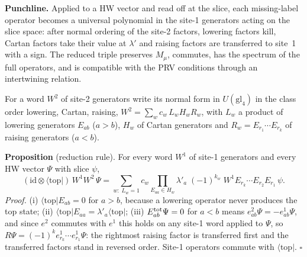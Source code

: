 \documentclass[11pt]{article}
\makeatletter
\renewcommand\subsection{\@startsection{subsection}{2}{\z@}{-2.0ex \@plus -1ex \@minus -.2ex}{0.6ex \@plus .2ex}{\normalfont\normalsize\bfseries}}
\makeatother
\begin{document}
\textbf{Punchline.} Applied to a HW vector and read off at the slice, each missing-label operator becomes a universal polynomial in the site-1 generators acting on the slice space: after normal ordering of the site-2 factors, lowering factors kill, Cartan factors take their value at $\lambda'$ and raising factors are transferred to site~1 with a sign.
The reduced triple preserves $M_\mu$, commutes, has the spectrum of the full operators, and is compatible with the PRV conditions through an intertwining relation.

\subsection{The rule}\label{sec:rule}

For a word $W^2$ of site-2 generators write its normal form in $U(\mathrm{gl}_4)$ in the class order lowering, Cartan, raising, $W^2=\sum_wc_w\,L_wH_wR_w$, with $L_w$ a product of lowering generators $E_{ab}$ ($a>b$), $H_w$ of Cartan generators and $R_w=E_{r_1}\cdots E_{r_k}$ of raising generators ($a<b$).

\textbf{Proposition} (reduction rule).
For every word $W^1$ of site-1 generators and every HW vector $\Psi$ with slice $\psi$,
\begin{equation}\label{eq:rule}
(\mathrm{id}\otimes\langle\mathrm{top}|)\,W^1W^2\,\Psi=\sum_{w:\;L_w=1}c_w\prod_{E_{aa}\in H_w}\lambda'_a\;(-1)^{k_w}\;W^1E_{r_k}\cdots E_{r_2}E_{r_1}\,\psi .
\end{equation}
\emph{Proof.} (i) $\langle\mathrm{top}|E_{ab}=0$ for $a>b$, because a lowering operator never produces the top state; (ii) $\langle\mathrm{top}|E_{aa}=\lambda'_a\langle\mathrm{top}|$; (iii) $E^{\rm tot}_{ab}\Psi=0$ for $a<b$ means $e^2_{ab}\Psi=-e^1_{ab}\Psi$, and since $e^2$ commutes with $e^1$ this holds on any site-1 word applied to $\Psi$, so $R\Psi=(-1)^ke^1_{r_k}\cdots e^1_{r_1}\Psi$: the rightmost raising factor is transferred first and the transferred factors stand in reversed order. Site-1 operators commute with $\langle\mathrm{top}|$. $\square$
\end{document}
